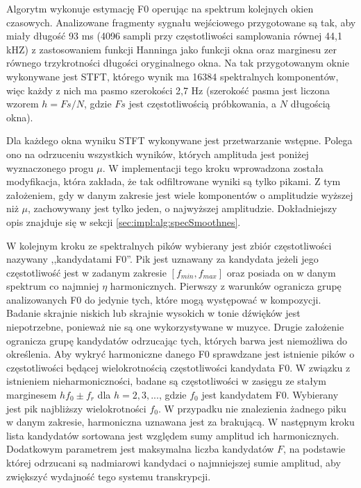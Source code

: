 \documentclass[12pt,a4paper,twoside]{mwart}
\begin{document}
Algorytm wykonuje estymację F0 operując na spektrum kolejnych okien czasowych. Analizowane fragmenty sygnału wejściowego przygotowane są tak, aby miały długość 93 ms (4096 sampli przy częstotliwości samplowania równej 44,1 kHZ) z zastosowaniem funkcji Hanninga jako funkcji okna oraz marginesu zer równego trzykrotności długości oryginalnego okna. Na tak przygotowanym oknie wykonywane jest STFT, którego wynik ma 16384 spektralnych komponentów, więc każdy z nich ma pasmo szerokości 2,7 Hz (szerokość pasma jest liczona wzorem $h = Fs / N$, gdzie $Fs$ jest częstotliwością próbkowania, a $N$ długością okna).

Dla każdego okna wyniku STFT wykonywane jest przetwarzanie wstępne. Polega ono na odrzuceniu wszystkich wyników, których amplituda jest poniżej wyznaczonego progu $\mu$. W implementacji tego kroku wprowadzona została modyfikacja, która zakłada, że tak odfiltrowane wyniki są tylko pikami. Z tym założeniem, gdy w danym zakresie jest wiele komponentów o amplitudzie wyższej niż $\mu$, zachowywany jest tylko jeden, o najwyższej amplitudzie. Dokładniejszy opis znajduje się w sekcji \ref{sec:impl:alg:specSmoothnes}.

W kolejnym kroku ze spektralnych pików wybierany jest zbiór częstotliwości nazywany ,,kandydatami F0''. Pik jest uznawany za kandydata jeżeli jego częstotliwość jest w zadanym zakresie $[f_{min}, f_{max}]$ oraz posiada on w danym spektrum co najmniej $\eta$ harmonicznych. Pierwszy z warunków ogranicza grupę analizowanych F0 do jedynie tych, które mogą występować w kompozycji. Badanie skrajnie niskich lub skrajnie wysokich w tonie dźwięków jest niepotrzebne, ponieważ nie są one wykorzystywane w muzyce. Drugie założenie ogranicza grupę kandydatów odrzucając tych, których barwa jest niemożliwa do określenia. Aby wykryć harmoniczne danego F0 sprawdzane jest istnienie pików o częstotliwości będącej wielokrotnością częstotliwości kandydata F0. W związku z istnieniem nieharmoniczności, badane są częstotliwości w zasięgu ze stałym marginesem $hf_0 \pm f_r$ dla $h = 2, 3, ...$, gdzie $f_0$ jest kandydatem F0. Wybierany jest pik najbliższy wielokrotności $f_0$. W przypadku nie znalezienia żadnego piku w danym zakresie, harmoniczna uznawana jest za brakującą. W następnym kroku lista kandydatów sortowana jest względem sumy amplitud ich harmonicznych. Dodatkowym parametrem jest maksymalna liczba kandydatów $F$, na podstawie której odrzucani są nadmiarowi kandydaci o najmniejszej sumie amplitud, aby zwiększyć wydajność tego systemu transkrypcji.
\end{document}
